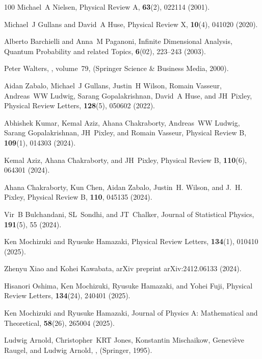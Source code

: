 \documentclass[preprint,pteplogo]{ptephy_v2}%
\numberwithin{equation}{section}
\theoremstyle{definition}
\begin{document}
\begin{thebibliography}{100}
Michael~A Nielsen, Physical Review A, {\bf 63}(2), 022114 (2001).

Michael~J Gullans and David~A Huse, Physical Review X, {\bf 10}(4), 041020 (2020).

Alberto Barchielli and Anna~M Paganoni, Infinite Dimensional Analysis, Quantum Probability and related Topics, {\bf 6}(02), 223--243 (2003).

Peter Walters,
, volume~79,
\newblock  (Springer Science \& Business Media, 2000).

Aidan Zabalo, Michael~J Gullans, Justin~H Wilson, Romain Vasseur, Andreas~WW Ludwig, Sarang Gopalakrishnan, David~A Huse, and JH~Pixley, Physical Review Letters, {\bf 128}(5), 050602 (2022).

Abhishek Kumar, Kemal Aziz, Ahana Chakraborty, Andreas~WW Ludwig, Sarang Gopalakrishnan, JH~Pixley, and Romain Vasseur, Physical Review B, {\bf 109}(1), 014303 (2024).

Kemal Aziz, Ahana Chakraborty, and JH~Pixley, Physical Review B, {\bf 110}(6), 064301 (2024).

Ahana Chakraborty, Kun Chen, Aidan Zabalo, Justin~H. Wilson, and J.~H. Pixley, Physical Review B, {\bf 110}, 045135 (2024).

Vir~B Bulchandani, SL~Sondhi, and JT~Chalker, Journal of Statistical Physics, {\bf 191}(5), 55 (2024).

Ken Mochizuki and Ryusuke Hamazaki, Physical Review Letters, {\bf 134}(1), 010410 (2025).

Zhenyu Xiao and Kohei Kawabata, arXiv preprint arXiv:2412.06133 (2024).

Hisanori Oshima, Ken Mochizuki, Ryusuke Hamazaki, and Yohei Fuji, Physical Review Letters, {\bf 134}(24), 240401 (2025).

Ken Mochizuki and Ryusuke Hamazaki, Journal of Physics A: Mathematical and Theoretical, {\bf 58}(26), 265004 (2025).

Ludwig Arnold, Christopher~KRT Jones, Konstantin Mischaikow, Genevi{\`e}ve Raugel, and Ludwig Arnold,
,
\newblock  (Springer, 1995).


\end{thebibliography}
\end{document}
